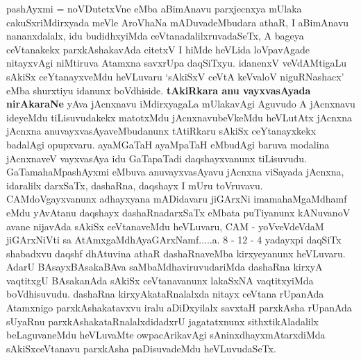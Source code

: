 \begin{artha}
pashAyxmi = noVDutetxVne eMba aBimAnavu parxjecnxya mUlaka cakuSxriMdirxyada meVle AroVhaNa mADuvadeMbudara athaR, I aBimAnavu nananxdalalx, idu budidhxyiMda ceVtanadalilxruvadaSeTx, A bageya ceVtanakekx parxkAshakavAda citetxV I hiMde heVLida loVpavAgade nitayxvAgi niMtiruva Atamxna savxrUpa daqSiTxyu. idanenxV veVdAMtigaLu sAkiSx ceYtanayxveMdu heVLuvaru `sAkiSxV ceVtA keVvaloV niguRNashacx' eMba shurxtiyu idanunx boVdhiside. {\bf tAkiRkara anu vayxvasAyada nirAkaraNe} yAva jAcnxnavu iMdirxyagaLa mUlakavAgi Aguvudo A jAcnxnavu ideyeMdu tiLisuvudakekx matotxMdu jAcnxnavubeVkeMdu heVLutAtx jAcnxna jAcnxna anuvayxvasAyaveMbudanunx tAtiRkaru sAkiSx ceYtanayxkekx badalAgi opupxvaru. ayaMGaTaH ayaMpaTaH eMbudAgi baruva modalina jAcnxnaveV vayxvasAya idu GaTapaTadi daqshayxvanunx tiLisuvudu. GaTamahaMpashAyxmi eMbuva anuvayxvasAyavu jAcnxna viSayada jAcnxna, idaralilx darxSaTx, dashaRna, daqshayx I mUru toVruvavu. CAMdoVgayxvanunx adhayxyana mADidavaru jiGArxNi imamahaMgaMdhamf eMdu yAvAtanu daqshayx dashaRnadarxSaTx eMbata puTiyanunx kANuvanoV avane nijavAda sAkiSx ceVtanaveMdu heVLuvaru, CAM - yoVveVdeVdaM jiGArxNiVti sa AtAmxgaMdhAyaGArxNamf.....a. 8 - 12 - 4 yadayxpi daqSiTx shabadxvu daqshf dhAtuvina athaR dashaRnaveMba kirxyeyanunx heVLuvaru. AdarU BAsayxBAsakaBAva saMbaMdhaviruvudariMda dashaRna kirxyA vaqtitxgU BAsakanAda sAkiSx ceVtanavanunx lakaSxNA vaqtitxyiMda boVdhisuvudu. dashaRna kirxyAkataRnalalxda nitayx ceVtana rUpanAda Atamxnigo parxkAshakatavxvu iralu aDiDxyilalx savxtaH parxkAsha rUpanAda sUyaRnu parxkAshakataRnalalxdidadxrU jagatatxnunx sithxtikAladalilx beLaguvaneMdu heVLuvaMte owpacArikavAgi sAninxdhayxmAtarxdiMda sAkiSxceVtanavu parxkAsha paDisuvadeMdu heVLuvudaSeTx.
\end{artha}%

